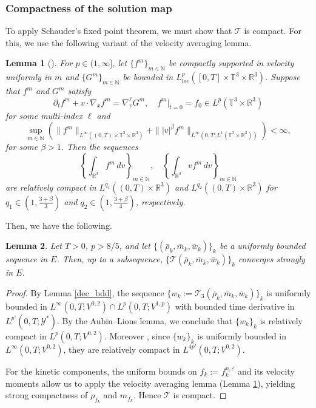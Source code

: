\documentclass[10pt,reqno]{amsart}
\numberwithin{equation}{section}
\newtheorem{lemma}{Lemma}[section]
\newcommand{\R}{\mathbb R}
\newcommand{\N}{\mathbb N}
\newcommand{\T}{\mathbb T}
\newcommand{\e}{\varepsilon}
\newcommand{\lt}{\left}
\newcommand{\rt}{\right}
\newcommand{\pa}{\partial}
\newcommand{\intr}{\int_{\R^3}}
\begin{document}
%
%
% 
%
%
\subsubsection{Compactness of the solution map}
To apply Schauder's fixed point theorem, we must show that $\mathcal{T}$ is compact. For this, we use the following variant of the velocity averaging lemma.
\begin{lemma}[{\cite[Lemma 2.7]{KMT13}}]\label{vel_av}
For $p\in (1,\infty]$, let $\{f^m\}_{m\in \N}$ be compactly supported in velocity uniformly in $m$ and $\{G^m\}_{m\in \N}$ be bounded in $L_{loc}^p([0,T]\times\T^3\times\R^3)$. Suppose that $f^m$ and $G^m$ satisfy
\[
\pa_t f^m + v \cdot \nabla_x f^m = \nabla_v^\ell G^m, \quad f^m|_{t=0} = f_0 \in L^p(\T^3 \times \R^3)
\] 
for some multi-index $\ell$ and 
\[
\sup_{m\in\N}\lt(\|f^m\|_{L^\infty((0,T)\times \T^3\times\R^3)} +  \||v|^\beta f^m\|_{L^\infty(0,T; L^1(\T^3\times\R^3))}\rt)<\infty,
\]
for some $\beta>1$. Then the sequences
\[
\lt\{ \intr f^m  \,dv\rt\}_{m\in \N} , \quad \lt\{ \intr vf^m  \,dv\rt\}_{m\in \N} 
\]
are relatively compact in $L^{q_1}((0,T)\times\R^3)$ and  $L^{q_2}((0,T)\times\R^3)$ for $q_1 \in \lt(1, \frac{3+\beta}{3}\rt)$ and $q_2 \in \lt(1, \frac{3+\beta}{4}\rt)$, respectively.
\end{lemma}
Then, we have the following.
\begin{lemma}
Let $T > 0$, $p > 8/5$, and let $\{(\bar\rho_k, \bar m_k, \bar w_k)\}_k$ be a uniformly bounded sequence in $E$. Then, up to a subsequence, $\{\mathcal{T}(\bar\rho_k, \bar m_k, \bar w_k)\}_k$ converges strongly in $E$.
\end{lemma}
\begin{proof}
By Lemma \ref{dec_bdd}, the sequence $\{w_k := \mathcal{T}_3(\bar\rho_k, \bar m_k, \bar w_k)\}_k$ is uniformly bounded in $L^\infty(0,T;V^{0,2}) \cap L^p(0,T;V^{1,p})$ with bounded time derivative in $L^{p'}(0,T;\mathcal{Y}^*)$. By the Aubin--Lions lemma, we conclude that $\{w_k\}_k$ is relatively compact in $L^p(0,T;V^{0,2})$. Moreover , since $\{w_k\}_k$ is uniformly bounded in $L^\infty(0,T;V^{0,2})$, they are relatively compact in $L^{4p'}(0,T;V^{0,2})$. 

For the kinetic components, the uniform bounds on $f_k := f^{n,\e}_k$ and its velocity moments allow us to apply the velocity averaging lemma (Lemma \ref{vel_av}), yielding strong compactness of $\rho_{f_k}$ and $m_{f_k}$. Hence $\mathcal{T}$ is compact.
\end{proof}
\end{document}
